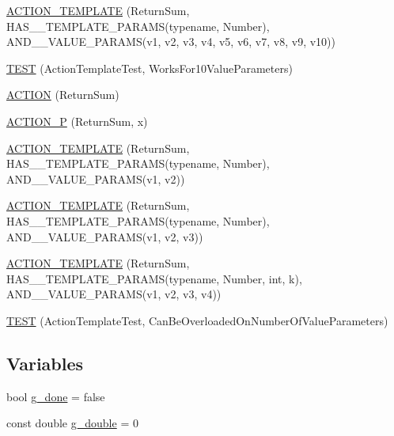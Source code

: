 \begin{DoxyCompactItemize}
\item 
\hyperlink{namespacetesting_1_1gmock__generated__actions__test_a0e21a6c1f43a7125a29e6e1edcd7006c}{A\+C\+T\+I\+O\+N\+\_\+\+T\+E\+M\+P\+L\+A\+TE} (Return\+Sum, H\+A\+S\+\_\+\_\+\+T\+E\+M\+P\+L\+A\+T\+E\+\_\+\+P\+A\+R\+A\+MS(typename, Number), A\+N\+D\+\_\+\_\+\+V\+A\+L\+U\+E\+\_\+\+P\+A\+R\+A\+MS(v1, v2, v3, v4, v5, v6, v7, v8, v9, v10))
\item 
\hyperlink{namespacetesting_1_1gmock__generated__actions__test_aa8dd9ea1777fe67626bab2815b7261f4}{T\+E\+ST} (Action\+Template\+Test, Works\+For10\+Value\+Parameters)
\item 
\hyperlink{namespacetesting_1_1gmock__generated__actions__test_a49c180470c75de1ab88cd2928e738d33}{A\+C\+T\+I\+ON} (Return\+Sum)
\item 
\hyperlink{namespacetesting_1_1gmock__generated__actions__test_acae7628c76df0e3b54ea80459fe3cf60}{A\+C\+T\+I\+O\+N\+\_\+P} (Return\+Sum, x)
\item 
\hyperlink{namespacetesting_1_1gmock__generated__actions__test_a0d95dcce021580cf2a2af2a91348a01b}{A\+C\+T\+I\+O\+N\+\_\+\+T\+E\+M\+P\+L\+A\+TE} (Return\+Sum, H\+A\+S\+\_\+\_\+\+T\+E\+M\+P\+L\+A\+T\+E\+\_\+\+P\+A\+R\+A\+MS(typename, Number), A\+N\+D\+\_\+\_\+\+V\+A\+L\+U\+E\+\_\+\+P\+A\+R\+A\+MS(v1, v2))
\item 
\hyperlink{namespacetesting_1_1gmock__generated__actions__test_a5241672e22af49093d3601ac42c9a5ca}{A\+C\+T\+I\+O\+N\+\_\+\+T\+E\+M\+P\+L\+A\+TE} (Return\+Sum, H\+A\+S\+\_\+\_\+\+T\+E\+M\+P\+L\+A\+T\+E\+\_\+\+P\+A\+R\+A\+MS(typename, Number), A\+N\+D\+\_\+\_\+\+V\+A\+L\+U\+E\+\_\+\+P\+A\+R\+A\+MS(v1, v2, v3))
\item 
\hyperlink{namespacetesting_1_1gmock__generated__actions__test_a03e55dabaa60ff2cda602c702ef3ff76}{A\+C\+T\+I\+O\+N\+\_\+\+T\+E\+M\+P\+L\+A\+TE} (Return\+Sum, H\+A\+S\+\_\+\_\+\+T\+E\+M\+P\+L\+A\+T\+E\+\_\+\+P\+A\+R\+A\+MS(typename, Number, int, k), A\+N\+D\+\_\+\_\+\+V\+A\+L\+U\+E\+\_\+\+P\+A\+R\+A\+MS(v1, v2, v3, v4))
\item 
\hyperlink{namespacetesting_1_1gmock__generated__actions__test_aa84c5b4f29e052340459e12649ce7209}{T\+E\+ST} (Action\+Template\+Test, Can\+Be\+Overloaded\+On\+Number\+Of\+Value\+Parameters)
\end{DoxyCompactItemize}
\subsection*{Variables}
\begin{DoxyCompactItemize}
\item 
bool \hyperlink{namespacetesting_1_1gmock__generated__actions__test_a5f828d39e27f0615498d5aa31c96916e}{g\+\_\+done} = false
\item 
const double \hyperlink{namespacetesting_1_1gmock__generated__actions__test_aa10d8101300a51dd20ab028fa9971313}{g\+\_\+double} = 0
\end{DoxyCompactItemize}


